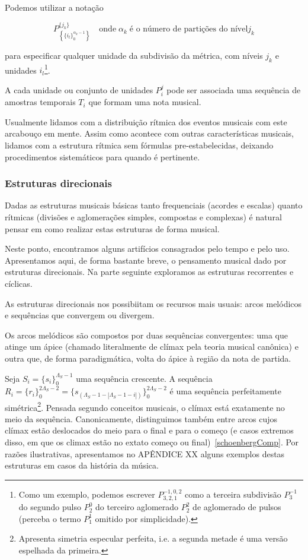 Podemos utilizar a notação

\begin{equation}
P^{ \{ j_k \} }_{\left \{ \{ i_{l} \}_0^{\alpha_{k}-1} \right \} } \quad \text{onde}\; \alpha_k \; \text{é o número de partições do nível} j_k
\end{equation}

para especificar qualquer unidade da subdivisão da métrica, com níveis $j_k$ e unidades $i_l$\footnote{Como um exemplo, podemos escrever $P^{-1,0,2}_{3,2,1}$  como a terceira subdivisão $P^{-1}_3$ do segundo
pulso $P^0_2$ do terceiro aglomerado $P^2_2$ de aglomerado de pulsos (perceba o termo $P^1_1$ omitido por simplicidade).}.

A cada unidade ou conjunto de unidades $P_i^j$ pode ser associada uma sequência de amostras temporais $T_i$
que formam uma nota musical. 

Usualmente lidamos com a distribuição rítmica dos eventos musicais com este arcabouço em mente. Assim como acontece com outras características
musicais, lidamos com a estrutura rítmica sem fórmulas pre-estabelecidas, deixando procedimentos sistemáticos para quando é pertinente.


\subsubsection{Estruturas direcionais}

Dadas as estruturas musicais básicas tanto frequenciais (acordes e escalas) quanto 
rítmicas (divisões e aglomerações simples, compostas e complexas) é 
natural pensar em como realizar estas estruturas de forma musical.

Neste ponto, encontramos alguns artifícios consagrados pelo tempo e pelo uso. 
Apresentamos aqui, de forma bastante breve, o pensamento musical dado por estruturas direcionais.
Na parte seguinte exploramos as estruturas recorrentes e cíclicas.

As estruturas direcionais nos possibiitam os recursos mais usuais: arcos melódicos e sequências que convergem ou divergem.

Os arcos melódicos são compostos por duas sequências convergentes: 
uma que atinge um ápice (chamado literalmente de clímax pela teoria musical canônica) e 
outra que, de forma paradigmática, volta do ápice à região da nota de partida.

Seja $S_i=\{s_i\}_0^{\Lambda_S-1}$ uma sequência crescente. A sequência 
$R_i=\{r_i\}_0^{2\Lambda_S -2}=\{s_{(\Lambda_S-1-|\Lambda_S-1-i|)}\}_0^{2\Lambda_S-2}$ 
é uma sequência perfeitamente simétrica\footnote{Apresenta simetria especular perfeita, i.e. a segunda metade é uma versão espelhada da primeira.}. Pensada segundo conceitos musicais, o clímax está exatamente no meio da sequência. 
Canonicamente, distinguimos também entre arcos cujos clímax estão deslocados do meio para o final 
e para o começo (e casos extremos disso, em que os climax estão no extato começo ou final)~\ref{schoenbergComp}.
Por razões ilustrativas, apresentamos no APÊNDICE XX alguns exemplos 
destas estruturas em casos da história da música.

